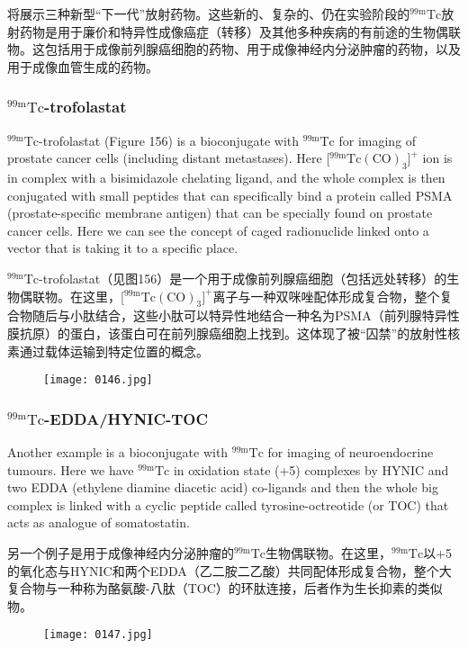 \documentclass[dvipsnames, svgnames,a4paper,11pt]{article}
\begin{document}
将展示三种新型“下一代”放射药物。这些新的、复杂的、仍在实验阶段的${}^\mathrm{99m}\mathrm{Tc}$放射药物是用于廉价和特异性成像癌症（转移）及其他多种疾病的有前途的生物偶联物。这包括用于成像前列腺癌细胞的药物、用于成像神经内分泌肿瘤的药物，以及用于成像血管生成的药物。

\subsubsection{${}^\mathrm{99m}\mathrm{Tc}$-trofolastat}
${}^\mathrm{99m}\mathrm{Tc}$-trofolastat (Figure 156) is a bioconjugate with ${}^\mathrm{99m}\mathrm{Tc}$ for imaging of prostate
cancer cells (including distant metastases). Here [${}^\mathrm{99m}\mathrm{Tc(CO)_3}]^+$ ion is in complex with
a bisimidazole chelating ligand, and the whole complex is then conjugated with small
peptides that can specifically bind a protein called PSMA (prostate-specific
membrane antigen) that can be specially found on prostate cancer cells. Here we
can see the concept of caged radionuclide linked onto a vector that is taking it to a
specific place.

${}^\mathrm{99m}\mathrm{Tc}$-trofolastat（见图156）是一个用于成像前列腺癌细胞（包括远处转移）的生物偶联物。在这里，[${}^\mathrm{99m}\mathrm{Tc(CO)_3}]^+$离子与一种双咪唑配体形成复合物，整个复合物随后与小肽结合，这些小肽可以特异性地结合一种名为PSMA（前列腺特异性膜抗原）的蛋白，该蛋白可在前列腺癌细胞上找到。这体现了被“囚禁”的放射性核素通过载体运输到特定位置的概念。

\begin{figure}[h]
	\centering
    \texttt{[image: 0146.jpg]}    
     \label{fig156}
\end{figure}

\subsubsection{${}^\mathrm{99m}\mathrm{Tc}$-EDDA/HYNIC-TOC}
Another example is a bioconjugate with ${}^\mathrm{99m}\mathrm{Tc}$ for imaging of neuroendocrine tumours.
Here we have ${}^\mathrm{99m}\mathrm{Tc}$ in oxidation state (+5) complexes by HYNIC and two EDDA
(ethylene diamine diacetic acid) co-ligands and then the whole big complex is linked
with a cyclic peptide called tyrosine-octreotide (or TOC) that acts as analogue of
somatostatin.

另一个例子是用于成像神经内分泌肿瘤的${}^\mathrm{99m}\mathrm{Tc}$生物偶联物。在这里，${}^\mathrm{99m}\mathrm{Tc}$以+5的氧化态与HYNIC和两个EDDA（乙二胺二乙酸）共同配体形成复合物，整个大复合物与一种称为酪氨酸-八肽（TOC）的环肽连接，后者作为生长抑素的类似物。
\begin{figure}[h]
	\centering
    \texttt{[image: 0147.jpg]}    
     \label{fig157}
\end{figure}
\end{document}
